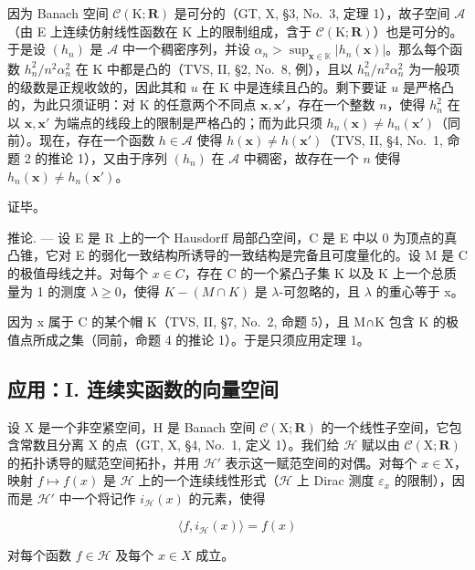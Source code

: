 因为 Banach 空间 \(\mathcal{C}(\mathrm{K};\mathbf{R})\) 是可分的（GT, X, §3, No.~3, 定理 1），故子空间 \(\mathcal{A}\)（由 E 上连续仿射线性函数在 K 上的限制组成，含于 \(\mathcal{C}(\mathrm{K};\mathbf{R})\)）也是可分的。于是设 \((h_n)\) 是 \(\mathcal{A}\) 中一个稠密序列，并设 \(\alpha_{n} > \sup_{\mathbf{x}\in \mathbb{K}}|h_n(\mathbf{x})|\)。那么每个函数 \(h_n^2 / n^2\alpha_n^2\) 在 K 中都是凸的（TVS, II, §2, No.~8, 例），且以 \(h_n^2 / n^2\alpha_n^2\) 为一般项的级数是正规收敛的，因此其和 \(u\) 在 K 中是连续且凸的。剩下要证 \(u\) 是严格凸的，为此只须证明：对 K 的任意两个不同点 \(\mathbf{x},\mathbf{x}'\)，存在一个整数 \(n\)，使得 \(h_n^2\) 在以 \(\mathbf{x},\mathbf{x}'\) 为端点的线段上的限制是严格凸的；而为此只须 \(h_n(\mathbf{x})\neq h_n(\mathbf{x}')\)（同前）。现在，存在一个函数 \(h\in \mathcal{A}\) 使得 \(h(\mathbf{x})\neq h(\mathbf{x}')\)（TVS, II, §4, No.~1, 命题 2 的推论 1），又由于序列 \((h_n)\) 在 \(\mathcal{A}\) 中稠密，故存在一个 \(n\) 使得 \(h_n(\mathbf{x})\neq h_n(\mathbf{x}')\)。

证毕。

推论. --- 设 E 是 R 上的一个 Hausdorff 局部凸空间，C 是 E 中以 0 为顶点的真凸锥，它对 E 的弱化一致结构所诱导的一致结构是完备且可度量化的。设 M 是 C 的极值母线之并。对每个 \(x \in C\)，存在 C 的一个紧凸子集 K 以及 K 上一个总质量为 1 的测度 \(\lambda \geqslant 0\)，使得 \(K - (M \cap K)\) 是 \(\lambda\)-可忽略的，且 \(\lambda\) 的重心等于 x。

因为 x 属于 C 的某个帽 K（TVS, II, §7, No.~2, 命题 5），且 M∩K 包含 K 的极值点所成之集（同前，命题 4 的推论 1）。于是只须应用定理 1。

\subsection{应用：I. 连续实函数的向量空间}

设 X 是一个非空紧空间，H 是 Banach 空间 \(\mathcal{C}(\mathrm{X};\mathbf{R})\) 的一个线性子空间，它包含常数且分离 X 的点（GT, X, §4, No.~1, 定义 1）。我们给 \(\mathcal{H}\) 赋以由 \(\mathcal{C}(\mathrm{X};\mathbf{R})\) 的拓扑诱导的赋范空间拓扑，并用 \(\mathcal{H}'\) 表示这一赋范空间的对偶。对每个 \(x\in \mathrm{X}\)，映射 \(f\mapsto f(x)\) 是 \(\mathcal{H}\) 上的一个连续线性形式（\(\mathcal{H}\) 上 Dirac 测度 \(\varepsilon_{x}\) 的限制），因而是 \(\mathcal{H}'\) 中一个将记作 \(i_{\mathcal{H}}(x)\) 的元素，使得

\[
\langle f, i _ {\mathcal {H}} (x) \rangle = f (x)\tag{9}
\]

对每个函数 \(f \in \mathcal{H}\) 及每个 \(x \in X\) 成立。

